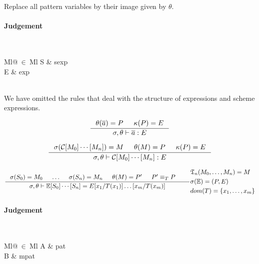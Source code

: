 Replace all pattern variables by their image given by $\theta$.


\paragraph{Judgement} \\
\indent\begin{tabular}{Ml@{$\ \in\ $}Ml}
  S & sexp\\
  E & exp
\end{tabular}\\

We have omitted the rules that deal with the structure of expressions and scheme
expressions.

\[
\inference
{
  \theta(\overline{a}) = P & \kappa(P) = E
}
{
  \sigma, \theta |- \overline{a} : E
}
\]

\[
\inference
{
  \sigma(\mathcal{C}[M_0]\cdots[M_n]) = M & \theta(M) = P & \kappa(P) = E
}
{
  \sigma, \theta |- \mathcal{C}[M_0]\cdots[M_n] : E
}
\]


\[
\inference
{
  \sigma(S_0) = M_0 & \ldots & \sigma(S_n) = M_n &
  \theta(M) = P' & P' \equiv_T P &
}
{
  \sigma, \theta |- \mathbb{E}[S_0]\cdots[S_n] = E[x_1/T(x_1)]\ldots[x_m/T(x_m)]
}
{
  \begin{aligned}
    & \mathfrak{T}_n(M_0, \ldots, M_n) = M\\
    & \sigma(\mathbb{E}) = (P, E)\\
    & dom(T) = \{x_1, \ldots, x_m\}
  \end{aligned}
}
\]


\paragraph{Judgement} \\
\indent\begin{tabular}{Ml@{$\ \in\ $}Ml}
  A & pat\\
  B & mpat
\end{tabular}

